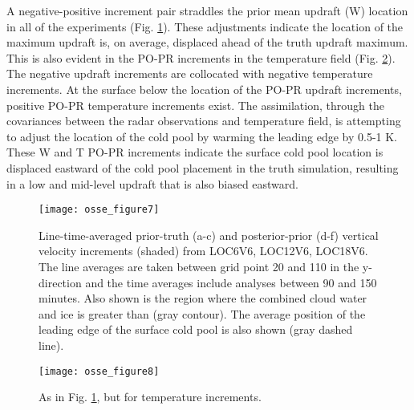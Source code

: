 A negative-positive increment pair straddles the prior mean updraft (W) location in all of the experiments (Fig. \ref{osse_fig7}). These adjustments indicate the location of the maximum updraft is, on average, displaced ahead of the truth updraft maximum. This is also evident in the PO-PR increments in the temperature field (Fig. \ref{osse_fig8}). The negative updraft increments are collocated with negative temperature increments. At the surface below the location of the PO-PR updraft increments, positive PO-PR temperature increments exist. The assimilation, through the covariances between the radar observations and temperature field, is attempting to adjust the location of the cold pool by warming the leading edge by 0.5-1 K. These W and T PO-PR increments indicate the surface cold pool location is displaced eastward of the cold pool placement in the truth simulation, resulting in a low and mid-level updraft that is also biased eastward.

\begin{figure}
\centering
\texttt{[image: osse\_figure7]}
\caption{Line-time-averaged prior-truth (a-c) and posterior-prior (d-f) vertical velocity increments (shaded) from LOC6V6, LOC12V6, LOC18V6. The line averages are taken between grid point 20 and 110 in the y-direction and the time averages include analyses between 90 and 150 minutes. Also shown is the region where the combined cloud water and ice is greater than (gray contour). The average position of the leading edge of the surface cold pool is also shown (gray dashed line). }
\label{osse_fig7}
\end{figure}

\begin{figure}
\centering
\texttt{[image: osse\_figure8]}
\caption{As in Fig. \ref{osse_fig7}, but for temperature increments.}
\label{osse_fig8}
\end{figure}

